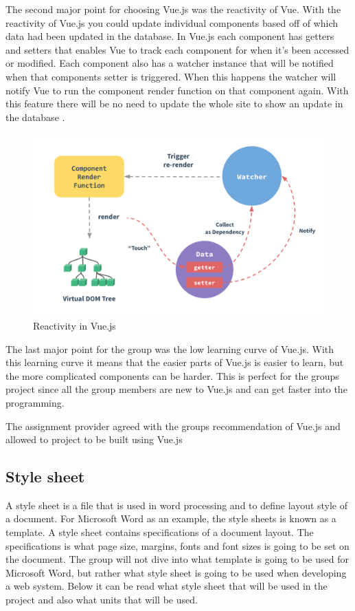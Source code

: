 The second major point for choosing Vue.js was the reactivity of Vue. With the reactivity of Vue.js you could update individual components based off of which data had been updated in the database. In Vue.js each component has getters and setters that enables Vue to track each component for when it's been accessed or modified. Each component also has a watcher instance that will be notified when that components setter is triggered. When this happens the watcher will notify Vue to run the component render function on that component again. With this feature there will be no need to update the whole site to show an update in the database \cite{vue-reactivity}. 

\begin{figure}[h]
    \centering
    \includegraphics[width=115mm,scale=1]{figures/reactivity.png}
    \caption{Reactivity in Vue.js}
    \label{fig:vue_reactivity}
\end{figure}

The last major point for the group was the low learning curve of Vue.js. With this learning curve it means that the easier parts of Vue.js is easier to learn, but the more complicated components can be harder. This is perfect for the groups project since all the group members are new to Vue.js and can get faster into the programming.

The assignment provider agreed with the groups recommendation of Vue.js and allowed to project to be built using Vue.js

\subsection{Style sheet}
A style sheet is a file that is used in word processing and to define layout style of a document\cite{Style_sheet}.
For Microsoft Word as an example, the style sheets is known as a template\cite{Style_sheet}.
A style sheet contains specifications of a document layout\cite{Style_sheet}. 
The specifications is what page size, margins, fonts and font sizes is going to be set on the document\cite{Style_sheet}.
The group will not dive into what template is going to be used for Microsoft Word, but rather what style sheet is going to be used when developing a web system. Below it can be read what style sheet that will be used in the project and also what units that will be used. 


